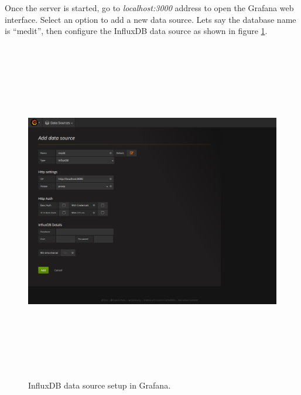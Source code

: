  
 Once the server is started, go to \textit{localhost:3000} address to open the Grafana web interface. Select an option to add a new data source. Lets say the database name is ``medit'', then configure the InfluxDB data source as shown in figure \ref{fig:gr_db_setup}.
 
 \begin{figure}[htpb]
 	\centering
 	\includegraphics[width=16cm,height=15cm,keepaspectratio=true]{images/gr_db_setup}
 	\caption{
 		InfluxDB data source setup in Grafana.
 	}
 	\label{fig:gr_db_setup}
 \end{figure}



